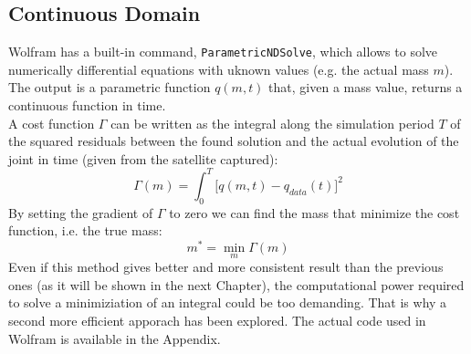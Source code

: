 \documentclass[a4paper,12pt,oneside]{report}
\begin{document}
\subsection{Continuous Domain}
Wolfram has a built-in command, \texttt{ParametricNDSolve}, which allows to solve numerically differential equations with uknown values (e.g. the actual mass $m$).\\
The output is a parametric function $q(m,t)$ that, given a mass value, returns a continuous function in time.\\
A cost function $\Gamma$ can be written as the integral along the simulation period $T$ of the squared residuals between the found solution and the actual evolution of the joint in time (given from the satellite captured):
\begin{equation}
  \Gamma(m)=\int_{0}^{T}\Big[q(m,t)-q_{data}(t)\Big]^2
\end{equation}
By setting the gradient of $\Gamma$ to zero we can find the mass that minimize the cost function, i.e. the true mass:
\begin{equation}
  m^*=\min_{m}\Gamma(m)
\end{equation}
Even if this method gives better and more consistent result than the previous ones (as it will be shown in the next Chapter), the computational power required to solve a minimiziation of an integral could be too demanding. That is why a second more efficient apporach has been explored.
The actual code used in Wolfram is available in the Appendix.
\newpage
\end{document}
